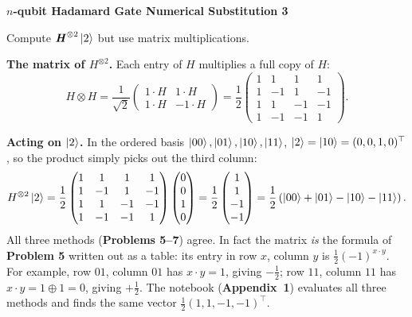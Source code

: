 \documentclass[a4paper, 10pt]{article}
\begin{document}
\begin{problem}
\textbf{\( n \)-qubit Hadamard Gate Numerical Substitution 3}
\par Compute \( \textbf{\textit{H}}^{\otimes 2} \ket{2} \) but use matrix multiplications.
\end{problem}

\begin{solution}
	\noindent \textbf{The matrix of \( H^{\otimes 2} \).} Each entry of \( H \) multiplies a full copy of \( H \):
	\[
		H \otimes H
		= \frac{1}{\sqrt{2}}\begin{pmatrix} 1 \cdot H & 1 \cdot H \\ 1 \cdot H & -1 \cdot H \end{pmatrix}
		= \frac{1}{2}\begin{pmatrix}
			1 & 1  & 1  & 1  \\
			1 & -1 & 1  & -1 \\
			1 & 1  & -1 & -1 \\
			1 & -1 & -1 & 1
		\end{pmatrix}.
	\]

	\noindent \textbf{Acting on \( \ket{2} \).} In the ordered basis \( \ket{00}, \ket{01}, \ket{10}, \ket{11} \), \( \ket{2} = \ket{10} = (0, 0, 1, 0)^{\top} \), so the product simply picks out the third column:
	\[
		H^{\otimes 2}\ket{2}
		= \frac{1}{2}\begin{pmatrix}
			1 & 1  & 1  & 1  \\
			1 & -1 & 1  & -1 \\
			1 & 1  & -1 & -1 \\
			1 & -1 & -1 & 1
		\end{pmatrix}
		\begin{pmatrix} 0 \\ 0 \\ 1 \\ 0 \end{pmatrix}
		= \frac{1}{2}\begin{pmatrix} 1 \\ 1 \\ -1 \\ -1 \end{pmatrix}
		= \frac{1}{2}\left(\ket{00} + \ket{01} - \ket{10} - \ket{11}\right).
	\]
	All three methods (\textbf{Problems 5--7}) agree.
	In fact the matrix \emph{is} the formula of \textbf{Problem 5} written out as a table: its entry in row \( x \), column \( y \) is \( \tfrac{1}{2}(-1)^{x \cdot y} \).
	For example, row \( 01 \), column \( 01 \) has \( x \cdot y = 1 \), giving \( -\tfrac{1}{2} \); row \( 11 \), column \( 11 \) has \( x \cdot y = 1 \oplus 1 = 0 \), giving \( +\tfrac{1}{2} \).
	The notebook (\textbf{Appendix~1}) evaluates all three methods and finds the same vector \( \tfrac{1}{2}(1, 1, -1, -1)^{\top} \).
\end{solution}
\end{document}

